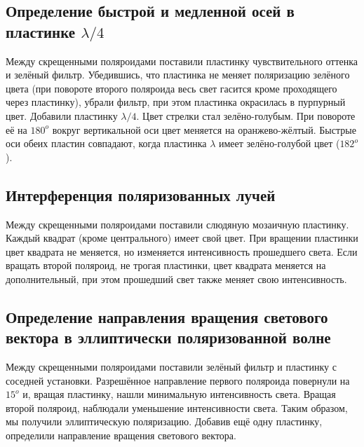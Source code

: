\subsection*{Определение быстрой и медленной осей в пластинке $\lambda/4$}
Между скрещенными поляроидами поставили пластинку чувствительного оттенка и зелёный фильтр. Убедившись, что пластинка не меняет поляризацию зелёного цвета (при повороте второго поляроида весь свет гасится кроме проходящего через пластинку), убрали фильтр, при этом пластинка окрасилась в пурпурный цвет. Добавили пластинку $\lambda/4$. Цвет стрелки стал зелёно-голубым. При повороте её на $180^o$ вокруг вертикальной оси цвет меняется на оранжево-жёлтый. Быстрые оси обеих пластин совпадают, когда пластинка $\lambda$ имеет зелёно-голубой цвет ($182^o$).
\subsection*{Интерференция поляризованных лучей}
Между скрещенными поляроидами поставили слюдяную мозаичную пластинку. Каждый квадрат (кроме центрального) имеет свой цвет. При вращении пластинки цвет квадрата не меняется, но изменяется интенсивность прошедшего света. Если вращать второй поляроид, не трогая пластинки, цвет квадрата меняется на дополнительный, при этом прошедший свет также меняет свою интенсивность.
\subsection*{Определение направления вращения светового вектора в эллиптически поляризованной волне}
Между скрещенными поляроидами поставили зелёный фильтр и пластинку с соседней установки. Разрешённое направление первого поляроида повернули на $15^o$ и, вращая пластинку, нашли минимальную интенсивность света. Вращая второй поляроид, наблюдали уменьшение интенсивности света. Таким образом, мы получили эллиптическую поляризацию. Добавив ещё одну пластинку, определили направление вращения светового вектора.
